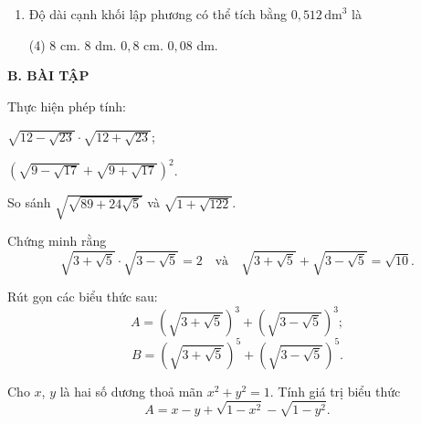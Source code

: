 \begin{practice}
\begin{enumerate}
        \item Độ dài cạnh khối lập phương có thể tích bằng $0{,}512\,\mathrm{dm}^3$ là
        \begin{tasks}(4)
            \task[(A)] $8$ cm.
            \task[(B)] $8$ dm.
            \task[(C)] $0{,}8$ cm.
            \task[(D)] $0{,}08$ dm.
        \end{tasks}
        \par\noindent\answerbox\par
    \end{enumerate}

    \textbf{B. BÀI TẬP}

    \begin{questions}[resume=SBT]
        \item Thực hiện phép tính:
        \begin{questions}
            \item $\sqrt{12-\sqrt{23}}\cdot\sqrt{12+\sqrt{23}}$;
            \item $\left(\sqrt{9-\sqrt{17}}+\sqrt{9+\sqrt{17}}\right)^2$.
        \end{questions}
        \answerline
        \answerline

        \item So sánh $\sqrt{\sqrt{89+24\sqrt{5}}}$ và $\sqrt{1+\sqrt{122}}$.
        \answerline
        \answerline

        \item
        \begin{questions}
            \item Chứng minh rằng
            \[
                \sqrt{3+\sqrt{5}}\cdot\sqrt{3-\sqrt{5}}=2
                \quad\text{và}\quad
                \sqrt{3+\sqrt{5}}+\sqrt{3-\sqrt{5}}=\sqrt{10}.
            \]
            \item Rút gọn các biểu thức sau:
            \[
                A=\left(\sqrt{3+\sqrt{5}}\right)^3
                +\left(\sqrt{3-\sqrt{5}}\right)^3;
            \]
            \[
                B=\left(\sqrt{3+\sqrt{5}}\right)^5
                +\left(\sqrt{3-\sqrt{5}}\right)^5.
            \]
        \end{questions}
        \answerline
        \answerline

        \item Cho $x$, $y$ là hai số dương thoả mãn $x^2+y^2=1$. Tính giá trị biểu thức
        \[
            A=x-y+\sqrt{1-x^2}-\sqrt{1-y^2}.
        \]
        \answerline
        \answerline


\end{questions}
\end{practice}
